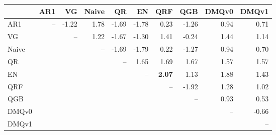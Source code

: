 \begin{tabular}{lrrrrrrrrr}
\toprule
 & AR1 & VG & Naive & QR & EN & QRF & QGB & DMQv0 & DMQv1 \\
\midrule
AR1 & -- & -1.22 & 1.78 & -1.69 & -1.78 & 0.23 & -1.26 & 0.94 & 0.71 \\
VG &  & -- & 1.22 & -1.67 & -1.30 & 1.41 & -0.24 & 1.44 & 1.14 \\
Naive &  &  & -- & -1.69 & -1.79 & 0.22 & -1.27 & 0.94 & 0.70 \\
QR &  &  &  & -- & 1.65 & 1.69 & 1.67 & 1.57 & 1.57 \\
EN &  &  &  &  & -- & \textbf{2.07} & 1.13 & 1.88 & 1.43 \\
QRF &  &  &  &  &  & -- & -1.92 & 1.28 & 1.02 \\
QGB &  &  &  &  &  &  & -- & 0.93 & 0.53 \\
DMQv0 &  &  &  &  &  &  &  & -- & -0.66 \\
DMQv1 &  &  &  &  &  &  &  &  & -- \\
\bottomrule
\end{tabular}
